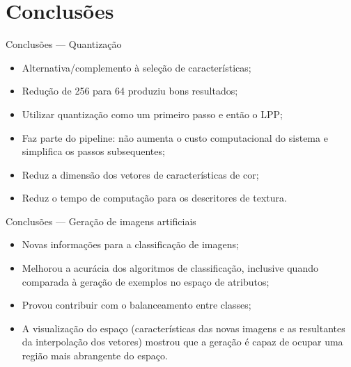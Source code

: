 \documentclass{beamer}
\begin{document}
\section{Conclusões}
\begin{frame}{Conclusões --- Quantização}
  \setlength\leftmargini{1em}
  \begin{itemize}
    \item Alternativa/complemento à seleção de características;
    \item Redução de 256 para 64 produziu bons resultados;
    \item Utilizar quantização como um primeiro passo e então o LPP;
    \item Faz parte do pipeline: não aumenta o custo computacional do sistema e simplifica os passos subsequentes;
    \item Reduz a dimensão dos vetores de características de cor;
    \item Reduz o tempo de computação para os descritores de textura.
  \end{itemize}
\end{frame}
\begin{frame}{Conclusões --- Geração de imagens artificiais}
  \setlength\leftmargini{1em}
  \begin{itemize}
    \item Novas informações para a classificação de imagens;
    \item Melhorou a acurácia dos algoritmos de classificação, inclusive quando comparada à geração de exemplos no espaço de atributos;
    \item Provou contribuir com o balanceamento entre classes;
    \item A visualização do espaço (características das novas imagens e as resultantes da interpolação dos vetores) mostrou que a geração é capaz de ocupar uma região mais abrangente do espaço.
  \end{itemize}
\end{frame}
\end{document}
